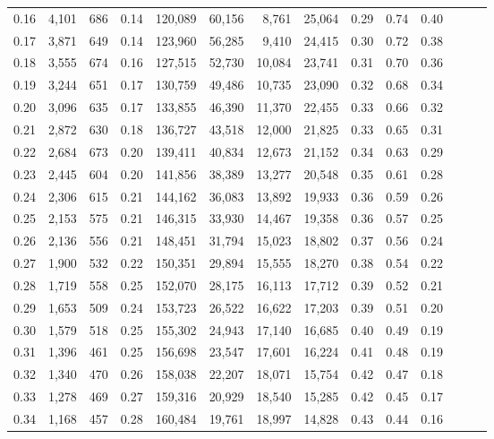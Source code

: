 \begin{tabular}{rrrrrrrrrrrrrr}
0.16 &   4,101 &  686 &  0.14 &  120,089 &   60,156 &   8,761 &  25,064 &  0.29 &  0.74 &      0.40 \\
0.17 &   3,871 &  649 &  0.14 &  123,960 &   56,285 &   9,410 &  24,415 &  0.30 &  0.72 &      0.38 \\
0.18 &   3,555 &  674 &  0.16 &  127,515 &   52,730 &  10,084 &  23,741 &  0.31 &  0.70 &      0.36 \\
0.19 &   3,244 &  651 &  0.17 &  130,759 &   49,486 &  10,735 &  23,090 &  0.32 &  0.68 &      0.34 \\
0.20 &   3,096 &  635 &  0.17 &  133,855 &   46,390 &  11,370 &  22,455 &  0.33 &  0.66 &      0.32 \\
0.21 &   2,872 &  630 &  0.18 &  136,727 &   43,518 &  12,000 &  21,825 &  0.33 &  0.65 &      0.31 \\
0.22 &   2,684 &  673 &  0.20 &  139,411 &   40,834 &  12,673 &  21,152 &  0.34 &  0.63 &      0.29 \\
0.23 &   2,445 &  604 &  0.20 &  141,856 &   38,389 &  13,277 &  20,548 &  0.35 &  0.61 &      0.28 \\
0.24 &   2,306 &  615 &  0.21 &  144,162 &   36,083 &  13,892 &  19,933 &  0.36 &  0.59 &      0.26 \\
0.25 &   2,153 &  575 &  0.21 &  146,315 &   33,930 &  14,467 &  19,358 &  0.36 &  0.57 &      0.25 \\
0.26 &   2,136 &  556 &  0.21 &  148,451 &   31,794 &  15,023 &  18,802 &  0.37 &  0.56 &      0.24 \\
0.27 &   1,900 &  532 &  0.22 &  150,351 &   29,894 &  15,555 &  18,270 &  0.38 &  0.54 &      0.22 \\
0.28 &   1,719 &  558 &  0.25 &  152,070 &   28,175 &  16,113 &  17,712 &  0.39 &  0.52 &      0.21 \\
0.29 &   1,653 &  509 &  0.24 &  153,723 &   26,522 &  16,622 &  17,203 &  0.39 &  0.51 &      0.20 \\
0.30 &   1,579 &  518 &  0.25 &  155,302 &   24,943 &  17,140 &  16,685 &  0.40 &  0.49 &      0.19 \\
0.31 &   1,396 &  461 &  0.25 &  156,698 &   23,547 &  17,601 &  16,224 &  0.41 &  0.48 &      0.19 \\
0.32 &   1,340 &  470 &  0.26 &  158,038 &   22,207 &  18,071 &  15,754 &  0.42 &  0.47 &      0.18 \\
0.33 &   1,278 &  469 &  0.27 &  159,316 &   20,929 &  18,540 &  15,285 &  0.42 &  0.45 &      0.17 \\
0.34 &   1,168 &  457 &  0.28 &  160,484 &   19,761 &  18,997 &  14,828 &  0.43 &  0.44 &      0.16 \\

\end{tabular}
